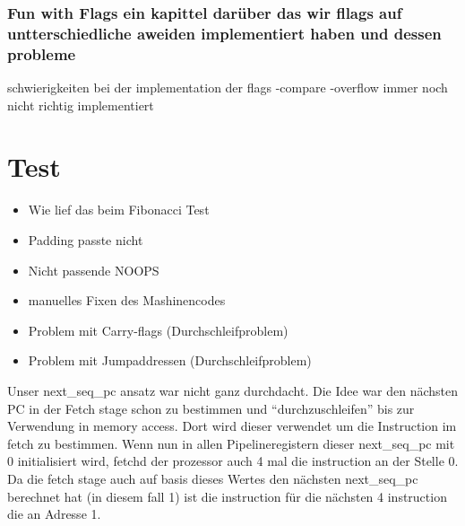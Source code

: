 \documentclass[paper=a4,fontsize=12pt]{scrreprt}
\begin{document}




\subsection{Fun with Flags ein kapittel darüber das wir fllags auf untterschiedliche aweiden implementiert haben und dessen probleme}

schwierigkeiten bei der implementation der flags
-compare
-overflow immer noch nicht richtig implementiert





\chapter{Test}
\begin{itemize}
    \item Wie lief das beim Fibonacci Test
    \item Padding passte nicht
    \item Nicht passende NOOPS
    \item manuelles Fixen des Mashinencodes
    \item Problem mit Carry-flags (Durchschleifproblem)
    \item Problem mit Jumpaddressen (Durchschleifproblem)
\end{itemize}

Unser next\_seq\_pc ansatz war nicht ganz durchdacht.
Die Idee war den nächsten PC in der Fetch stage schon zu bestimmen und \enquote{durchzuschleifen} bis zur Verwendung in memory access.
Dort wird dieser verwendet um die Instruction im fetch zu bestimmen.
Wenn nun in allen Pipelineregistern dieser next\_seq\_pc mit 0 initialisiert wird, fetchd der prozessor auch 4 mal die instruction an der Stelle 0.
Da die fetch stage auch auf basis dieses Wertes den nächsten next\_seq\_pc berechnet hat (in diesem fall 1) ist die instruction für die nächsten 4 instruction die an Adresse 1.
\end{document}
